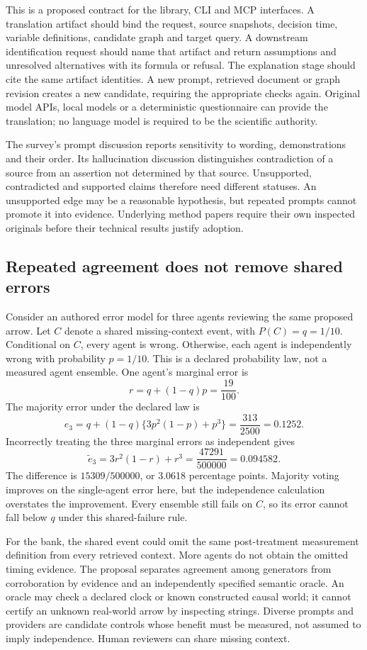 This is a proposed contract for the library, CLI and MCP interfaces. A translation
artifact should bind the request, source snapshots, decision time, variable
definitions, candidate graph and target query. A downstream identification request
should name that artifact and return assumptions and unresolved alternatives
with its formula or refusal. The explanation stage should cite the same artifact
identities. A new prompt, retrieved document or graph revision creates a new
candidate, requiring the appropriate checks again. Original model APIs, local
models or a deterministic questionnaire can provide the translation; no language
model is required to be the scientific authority.

The survey's prompt discussion reports sensitivity to wording, demonstrations
and their order. Its hallucination discussion distinguishes contradiction of a
source from an assertion not determined by that source. Unsupported, contradicted
and supported claims therefore need different statuses. An unsupported edge may
be a reasonable hypothesis, but repeated prompts cannot promote it into evidence.
Underlying method papers require their own inspected originals before their
technical results justify adoption.~\citep{exec24_llmchallenges_original}

\subsection{Repeated agreement does not remove shared errors}

Consider an authored error model for three agents reviewing the same proposed
arrow. Let $C$ denote a shared missing-context event, with $P(C)=q=1/10$.
Conditional on $C$, every agent is wrong. Otherwise, each agent is independently
wrong with probability $p=1/10$. This is a declared probability law, not a
measured agent ensemble. One agent's marginal error is
\[
 r=q+(1-q)p=\frac{19}{100}.
\]
The majority error under the declared law is
\[
 e_3=q+(1-q)\{3p^2(1-p)+p^3\}
     =\frac{313}{2500}=0.1252.
\]
Incorrectly treating the three marginal errors as independent gives
\[
 \widetilde e_3=3r^2(1-r)+r^3
     =\frac{47291}{500000}=0.094582.
\]
The difference is $15309/500000$, or 3.0618 percentage points. Majority voting
improves on the single-agent error here, but the independence calculation
overstates the improvement. Every ensemble still fails on $C$, so its error
cannot fall below $q$ under this shared-failure rule.
\citep{exec24_llmchallenges_reference}

For the bank, the shared event could omit the same post-treatment measurement
definition from every retrieved context. More agents do not obtain the omitted
timing evidence. The proposal separates agreement among generators from
corroboration by evidence and an independently specified semantic oracle.
An oracle may check a declared clock or known constructed causal world; it
cannot certify an unknown real-world arrow by inspecting strings. Diverse
prompts and providers are candidate controls whose benefit must be measured,
not assumed to imply independence. Human reviewers can share missing context.


